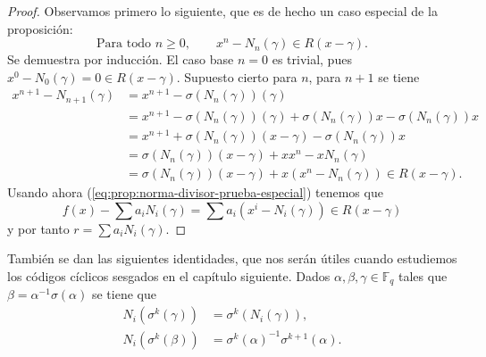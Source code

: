 \begin{proof}
  Observamos primero lo siguiente, que es de hecho un caso especial de la proposición:
  \begin{equation}
    \label{eq:prop:norma-divisor-prueba-especial}
    \text{Para todo } n \geq 0, \qquad x^n - N_n(\gamma) \in R(x - \gamma).
  \end{equation}
  Se demuestra por inducción.
  El caso base \(n = 0\) es trivial, pues \(x ^0 - N_0(\gamma) = 0 \in R(x - \gamma)\).
  Supuesto cierto para \(n\), para \(n + 1\) se tiene
  \begin{align*}
    x^{n+1} - N_{n+1}(\gamma) &= x^{n+1} - \sigma(N_{n}(\gamma))(\gamma)\\
      &= x^{n+1} - \sigma(N_{n}(\gamma))(\gamma) + \sigma(N_n(\gamma))x - \sigma(N_n(\gamma))x\\
      &= x^{n+1} + \sigma(N_{n}(\gamma))(x - \gamma) - \sigma(N_n(\gamma))x\\
      &= \sigma(N_{n}(\gamma))(x - \gamma) + xx^{n} - xN_n(\gamma)\\
      &= \sigma(N_{n}(\gamma))(x - \gamma) + x(x^{n} - N_n(\gamma))\in R(x - \gamma).
  \end{align*}
  Usando ahora (\ref{eq:prop:norma-divisor-prueba-especial}) tenemos que 
  \[
    f(x) - \sum a_iN_i(\gamma) = \sum a_i(x^{i} - N_i(\gamma)) \in R(x - \gamma)
  \]
  y por tanto \(r = \sum a_iN_i(\gamma)\).
\end{proof}

También se dan las siguientes identidades, que nos serán útiles cuando estudiemos los códigos cíclicos sesgados en el capítulo siguiente.
Dados \(\alpha, \beta, \gamma \in \mathbb F_q\) tales que \(\beta = \alpha^{-1}\sigma(\alpha)\) se tiene que
\begin{align}
  N_i(\sigma^k(\gamma)) &= \sigma^k(N_i(\gamma)),\nonumber\\
  N_i(\sigma^k(\beta)) &= \sigma^k(\alpha)^{-1}\sigma^{k+1}(\alpha).
  \label{eq:norma-beta}
\end{align}